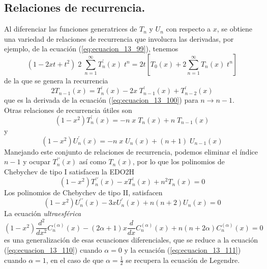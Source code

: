 \subsection{Relaciones de recurrencia.}
Al diferenciar las funciones generatrices de $T_{n}$ y $U_{n}$ con respecto a $x$, se obtiene una variedad de relaciones de recurrencia que involucra las derivadas, por ejemplo, de la ecuación (\ref{eq:ecuacion_13_99}), tenemos
\[ (1 - 2xt +  t^{2}) \; 2 \; \sum_{n=1}^{\infty} T_{n}^{\prime} (x) \; t^{n} =  2 t \left[ T_{0}(x) + 2 \sum_{n=1}^{\infty} T_{n}(x) \; t^{n} \right] \]
de la que se genera la recurrencia
\begin{equation}
2 T_{n-1} (x) = T_{n}^{\prime} (x) - 2 x \; T_{n-1}^{\prime} (x) +  T_{n-2}^{\prime}(x)
\label{eq:ecuacion_13_107}
\end{equation}
que es la derivada de la ecuación (\ref{eq:ecuacion_13_100}) para $n \to n-1$.
\\
Otras relaciones de recurrencia útiles son
\begin{equation}
(1 - x^{2}) T_{n}^{\prime} (x) = -n \; x \; T_{n}(x) + n \; T_{n-1}(x)
\label{eq:ecuacion_13_108}
\end{equation}
y 
\begin{equation}
(1 - x^{2}) U_{n}^{\prime} (x) = -n \; x \; U_{n}(x) + (n + 1) \; U_{n-1}(x)
\label{eq:ecuacion_13_109}
\end{equation}
Manejando este conjunto de relaciones de recurrencia, podemos eliminar el índice $n-1$ y ocupar $T_{n}^{\prime \prime} (x)$ así como $T_{n}(x)$, por lo que los polinomios de Chebychev de tipo I satisfacen la EDO2H
\begin{equation}
(1 - x^{2}) T_{n}^{\prime \prime} (x) - x T_{n}^{\prime} (x) + n^{2} T_{n} (x) = 0
\label{eq:ecuacion_13_110}
\end{equation}
Los polinomios de Chebychev de tipo II, satisfacen
\begin{equation}
(1 - x^{2}) U_{n}^{\prime \prime} (x) - 3 x U_{n}^{\prime} (x) + n(n +2) U_{n} (x) = 0
\label{eq:ecuacion_13_111}
\end{equation}
La ecuación \emph{ultraesférica}
\begin{equation}
(1 - x^{2}) \dfrac{d^{2}}{d x^{2}} C_{n}^{(\alpha)} (x) - (2 \alpha + 1) x \dfrac{d}{dx} C_{n}^{(\alpha)} (x) + n(n + 2\alpha) C_{n}^{(\alpha)} (x) = 0
\label{eq:ecuacion_13_112}
\end{equation}
es una generalización de esas ecuaciones diferenciales, que se reduce a la ecuación (\ref{eq:ecuacion_13_110}) cuando $\alpha=0$ y la ecuación (\ref{eq:ecuacion_13_111}) cuando $\alpha = 1$, en el caso de que $\alpha = \frac{1}{2}$ se recupera la ecuación de Legendre.
